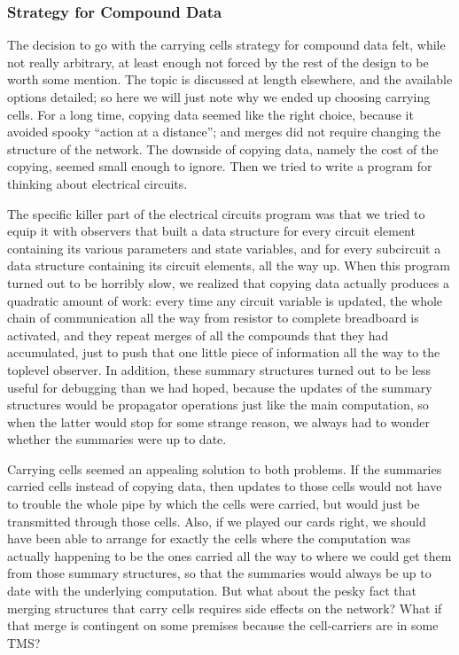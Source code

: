 \documentclass[12pt,letterpaper,english]{article}
\begin{document}

\hypertarget{strategy-for-compound-data}{}
\subsubsection{Strategy for Compound Data}
\label{strategy-for-compound-data}

The decision to go with the carrying cells strategy for
compound data felt, while not really arbitrary, at least enough not
forced by the rest of the design to be worth some mention.  The topic
is discussed at length elsewhere, and the available options detailed;
so here we will just note why we ended up choosing carrying cells.
For a long time, copying data seemed like the right choice, because it
avoided spooky ``action at a distance''; and merges did not require
changing the structure of the network.  The downside of copying data,
namely the cost of the copying, seemed small enough to ignore.  Then
we tried to write a program for thinking about electrical circuits.

The specific killer part of the electrical circuits program was that
we tried to equip it with observers that built a data structure for
every circuit element containing its various parameters and state
variables, and for every subcircuit a data structure containing its
circuit elements, all the way up.  When this program turned out to be
horribly slow, we realized that copying data actually produces a
quadratic amount of work: every time any circuit variable is updated,
the whole chain of communication all the way from resistor to complete
breadboard is activated, and they repeat merges of all the compounds
that they had accumulated, just to push that one little piece of
information all the way to the toplevel observer.  In addition, these
summary structures turned out to be less useful for debugging than we
had hoped, because the updates of the summary structures would be
propagator operations just like the main computation, so when the
latter would stop for some strange reason, we always had to wonder
whether the summaries were up to date.

Carrying cells seemed an appealing solution to both problems.  If the
summaries carried cells instead of copying data, then updates to those
cells would not have to trouble the whole pipe by which the cells were
carried, but would just be transmitted through those cells.  Also, if
we played our cards right, we should have been able to arrange for
exactly the cells where the computation was actually happening to be
the ones carried all the way to where we could get them from those
summary structures, so that the summaries would always be up to date
with the underlying computation.  But what about the pesky fact that
merging structures that carry cells requires side effects on the
network?  What if that merge is contingent on some premises because
the cell-carriers are in some TMS?
\end{document}

